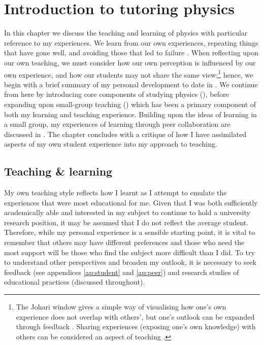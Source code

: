 \chapter{Introduction to tutoring physics}\label{ch:intro}

In this chapter we discuss the teaching and learning of physics with particular reference to my experiences. We learn from our own experiences, repeating things that have gone well, and avoiding those that led to failure \citep[chapter 2]{Skinner1954,Kolb1984}. When reflecting upon our own teaching, we must consider how our own perception is influenced by our own experience, and how our students may not share the same view;\footnote{The Johari window gives a simple way of visualising how one's own experience does not overlap with others', but one's outlook can be expanded through feedback \citep{Luft1961}. Sharing experiences (exposing one's own knowledge) with others can be considered an aspect of teaching \citep[cf.][chapter 7]{Ramsden1992}.} hence, we begin with a brief summary of my personal development to date in . We continue from here by introducing core components of studying physics (), before expanding upon small-group teaching () which has been a primary component of both my learning and teaching experience. Building upon the ideas of learning in a small group, my experiences of learning through peer collaboration are discussed in . The chapter concludes with a critique of how I have assimilated aspects of my own student experience into my approach to teaching.

\section{Teaching \& learning}\label{sec:teach-n-learn}

My own teaching style reflects how I learnt as I attempt to emulate the experiences that were most educational for me. Given that I was both sufficiently academically able and interested in my subject to continue to hold a university research position, it may be assumed that I do not reflect the average student. Therefore, while my personal experience is a sensible starting point, it is vital to remember that others may have different preferences \citep[chapter 5]{Ramsden1992} and those who need the most support will be those who find the subject more difficult than I did. To try to understand other perspectives and broaden my outlook, it is necessary to seek feedback (see appendices \ref{ap:student} and \ref{ap:peer}) and research studies of educational practices (discussed throughout).

